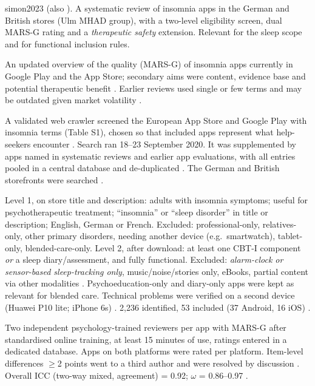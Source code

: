 \begin{papercard}{simon2023}
    (also ). A systematic review of insomnia apps in the German and British stores (Ulm MHAD group), with a two-level eligibility screen, dual MARS-G rating and a \emph{therapeutic safety} extension. Relevant for the sleep scope and for functional inclusion rules.

 An updated overview of the quality (MARS-G) of insomnia apps currently in Google Play and the App Store; secondary aims were content, evidence base and potential therapeutic benefit . Earlier reviews used single or few terms and may be outdated given market volatility .

 A validated web crawler screened the European App Store and Google Play with insomnia terms (Table S1), chosen so that included apps represent what help-seekers encounter . Search ran 18--23 September 2020. It was supplemented by apps named in systematic reviews and earlier app evaluations, with all entries pooled in a central database and de-duplicated . The German and British storefronts were searched .

 Level 1, on store title and description: adults with insomnia symptoms; useful for psychotherapeutic treatment; ``insomnia'' or ``sleep disorder'' in title or description; English, German or French. Excluded: professional-only, relatives-only, other primary disorders, needing another device (e.g.\ smartwatch), tablet-only, blended-care-only. Level 2, after download: at least one CBT-I component \emph{or} a sleep diary/assessment, and fully functional. Excluded: \emph{alarm-clock or sensor-based sleep-tracking only}, music/noise/stories only, eBooks, partial content via other modalities . Psychoeducation-only and diary-only apps were kept as relevant for blended care. Technical problems were verified on a second device (Huawei P10 lite; iPhone 6s) . 2{,}236 identified, 53 included (37 Android, 16 iOS) .

 Two independent psychology-trained reviewers per app with MARS-G after standardised online training, at least 15 minutes of use, ratings entered in a dedicated database. Apps on both platforms were rated per platform. Item-level differences $\geq$2 points went to a third author and were resolved by discussion . Overall ICC (two-way mixed, agreement) = 0.92; $\omega$ = 0.86--0.97 .


\end{papercard}
